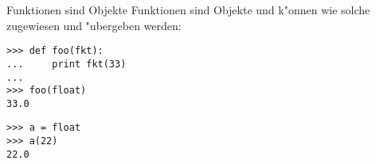 \begin{frame}[fragile]{Funktionen sind Objekte}
Funktionen sind Objekte und k"onnen wie solche zugewiesen und "ubergeben werden:
\begin{lstlisting}[style=Shell]
>>> def foo(fkt):
...     print fkt(33)
...
>>> foo(float)
33.0
\end{lstlisting}
\begin{lstlisting}[style=Shell]
>>> a = float
>>> a(22)
22.0
\end{lstlisting}
\end{frame}


